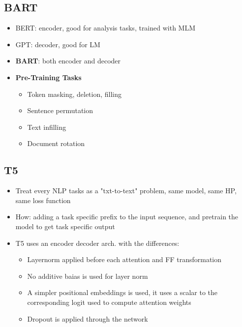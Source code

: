 \subsection{BART}
\begin{itemize}
    \item BERT: encoder, good for analysis tasks, trained with MLM 
    \item GPT: decoder, good for LM
    \item \textbf{BART}: both encoder and decoder
    \item \textbf{Pre-Training Tasks}
    \begin{itemize}
        \item Token masking, deletion, filling
        \item Sentence permutation
        \item Text infilling
        \item Document rotation
    \end{itemize}
\end{itemize}
\subsection{T5}
\begin{itemize}
    \item Treat every NLP tasks as a "txt-to-text" problem, same model, same HP, same loss function
    \item How: adding a task specific prefix to the input sequence, and pretrain the model to get task specific output 
    \item T5 uses an encoder decoder arch. with the differences:
    \begin{itemize}
        \item Layernorm applied before each attention and FF transformation
        \item No additive baias is used for layer norm
        \item A simpler positional embeddings is used, it uses a scalar to the corresponding logit used to compute attention weights
        \item Dropout is applied through the network
    \end{itemize}
\end{itemize}
